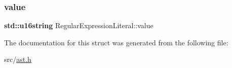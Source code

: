 \subsubsection{\texorpdfstring{value}{value}}
{\footnotesize\ttfamily \textbf{ std\+::u16string} Regular\+Expression\+Literal\+::value}



The documentation for this struct was generated from the following file\+:\begin{DoxyCompactItemize}
\item 
src/\hyperlink{ast_8h}{ast.\+h}\end{DoxyCompactItemize}
